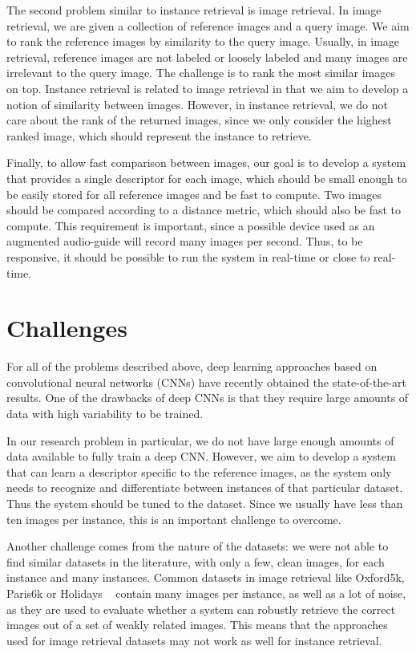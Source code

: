 The second problem similar to instance retrieval is image retrieval.
In image retrieval,
we are given a collection of reference images and a query image.
We aim to rank the reference images by similarity to the query image.
Usually, in image retrieval, reference images are not labeled or loosely
labeled and many images are irrelevant to the query image. The challenge
is to rank the most similar images on top.
Instance retrieval is related to image retrieval in that we aim to
develop a notion of similarity between images. However, in instance
retrieval, we do not care about the rank of the returned images, since
we only consider the highest ranked image, which should represent the
instance to retrieve.

Finally, to allow fast comparison between images, our goal is to develop
a system that provides a single descriptor for each image, which should
be small enough to be easily stored for all reference images and be fast
to compute.
Two images should be compared according to a distance metric, which should
also be fast to compute. This requirement is important, since a possible
device used as an augmented audio-guide will record many images per second.
Thus, to be responsive, it should be possible to run the system in
real-time or close to real-time.


\section{Challenges}
For all of the problems described above, deep learning approaches
based on convolutional neural networks (CNNs) have recently obtained
the state-of-the-art results. One of the drawbacks of deep CNNs is that
they require large amounts of data with high variability to be trained.

In our research problem in particular, we do not
have large enough amounts of data available to fully train a deep CNN.
However, we aim to develop a system that can learn a descriptor
specific to the reference images,
as the system only needs to recognize and differentiate between
instances of that particular dataset. Thus the system should be tuned to
the dataset. Since we usually have less than ten images per instance,
this is an important challenge to overcome.

Another challenge comes from the nature of the datasets: we were not
able to find similar datasets in the literature, with only a few,
clean images, for each instance and many instances.
Common datasets in image retrieval like Oxford5k, Paris6k or Holidays
~\cite{philbin_object_2007,philbin_lost_2008,jegou_hamming_2008}
contain many images per instance, as well as a lot of noise,
as they are used to evaluate whether a system can robustly retrieve the
correct images out of a set of weakly related images.
This means that the approaches used for image retrieval datasets may
not work as well for instance retrieval.


